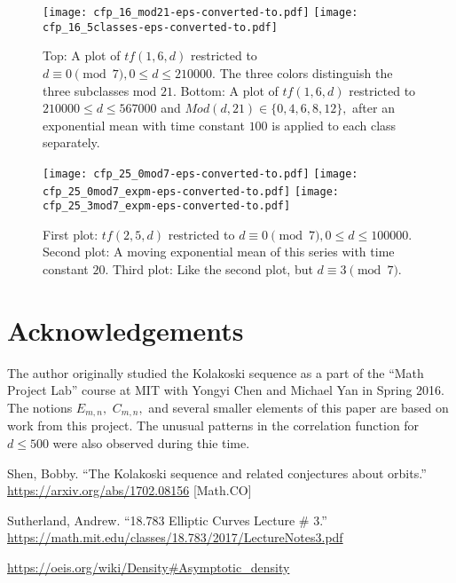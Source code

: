 \documentclass[11pt]{amsart} %
\begin{document}
\begin{figure}[htbp]
\centering
\texttt{[image: cfp\_16\_mod21-eps-converted-to.pdf]}
\texttt{[image: cfp\_16\_5classes-eps-converted-to.pdf]}
\caption{Top: A plot of $tf(1,6,d)$ restricted to $d \equiv 0 \pmod{7}, 0 \le d \le 210000.$ The three colors distinguish the three subclasses $\text{mod}$ $21.$ Bottom: A plot of $tf(1,6,d)$ restricted to $210000 \le d \le 567000$ and $Mod(d,21) \in \{0, 4, 6, 8, 12\},$ after an exponential mean with time constant $100$ is applied to each class separately.
}
\label{fig:tf16d-est2}
\end{figure}

\begin{figure}[htbp]
\centering
\texttt{[image: cfp\_25\_0mod7-eps-converted-to.pdf]}
\texttt{[image: cfp\_25\_0mod7\_expm-eps-converted-to.pdf]}
\texttt{[image: cfp\_25\_3mod7\_expm-eps-converted-to.pdf]}
\caption{First plot: $tf(2,5,d)$ restricted to $d \equiv 0 \pmod{7}, 0 \le d \le 100000.$ Second plot: A moving exponential mean of this series with time constant $20.$ Third plot: Like the second plot, but $d \equiv 3 \pmod{7}.$
}
\label{fig:tf25d-est2}
\end{figure}

\section{Acknowledgements}
The author originally studied the Kolakoski sequence as a part of the ``Math Project Lab'' course at MIT with Yongyi Chen and Michael Yan in Spring 2016. 
The notions $E_{m, n},$ $C_{m, n},$ and several smaller elements of this paper are based on work from this project. The unusual patterns in the correlation function for $d \le 500$ were also observed during thie time.

\begin{thebibliography}{9}


 Shen, Bobby. ``The Kolakoski sequence and related conjectures about orbits.'' 
 \url{https://arxiv.org/abs/1702.08156} [Math.CO]
 
  Sutherland, Andrew. ``18.783 Elliptic Curves Lecture \# 3.'' \url{https://math.mit.edu/classes/18.783/2017/LectureNotes3.pdf} 
 
\url{https://oeis.org/wiki/Density#Asymptotic_density}

\end{thebibliography}
\end{document}
